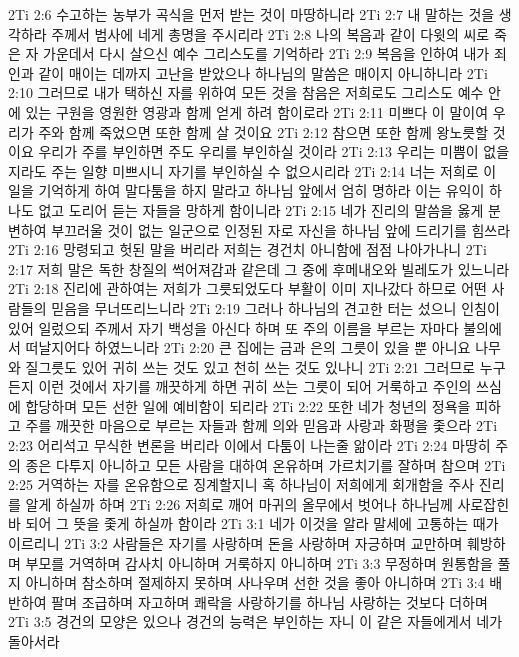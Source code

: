 2Ti 2:6  수고하는 농부가 곡식을 먼저 받는 것이 마땅하니라
2Ti 2:7  내 말하는 것을 생각하라 주께서 범사에 네게 총명을 주시리라
2Ti 2:8  나의 복음과 같이 다윗의 씨로 죽은 자 가운데서 다시 살으신 예수 그리스도를 기억하라
2Ti 2:9  복음을 인하여 내가 죄인과 같이 매이는 데까지 고난을 받았으나 하나님의 말씀은 매이지 아니하니라
2Ti 2:10  그러므로 내가 택하신 자를 위하여 모든 것을 참음은 저희로도 그리스도 예수 안에 있는 구원을 영원한 영광과 함께 얻게 하려 함이로라
2Ti 2:11  미쁘다 이 말이여 우리가 주와 함께 죽었으면 또한 함께 살 것이요
2Ti 2:12  참으면 또한 함께 왕노릇할 것이요 우리가 주를 부인하면 주도 우리를 부인하실 것이라
2Ti 2:13  우리는 미쁨이 없을지라도 주는 일향 미쁘시니 자기를 부인하실 수 없으시리라
2Ti 2:14  너는 저희로 이 일을 기억하게 하여 말다툼을 하지 말라고 하나님 앞에서 엄히 명하라 이는 유익이 하나도 없고 도리어 듣는 자들을 망하게 함이니라
2Ti 2:15  네가 진리의 말씀을 옳게 분변하여 부끄러울 것이 없는 일군으로 인정된 자로 자신을 하나님 앞에 드리기를 힘쓰라
2Ti 2:16  망령되고 헛된 말을 버리라 저희는 경건치 아니함에 점점 나아가나니
2Ti 2:17  저희 말은 독한 창질의 썩어져감과 같은데 그 중에 후메내오와 빌레도가 있느니라
2Ti 2:18  진리에 관하여는 저희가 그릇되었도다 부활이 이미 지나갔다 하므로 어떤 사람들의 믿음을 무너뜨리느니라
2Ti 2:19  그러나 하나님의 견고한 터는 섰으니 인침이 있어 일렀으되 주께서 자기 백성을 아신다 하며 또 주의 이름을 부르는 자마다 불의에서 떠날지어다 하였느니라
2Ti 2:20  큰 집에는 금과 은의 그릇이 있을 뿐 아니요 나무와 질그릇도 있어 귀히 쓰는 것도 있고 천히 쓰는 것도 있나니
2Ti 2:21  그러므로 누구든지 이런 것에서 자기를 깨끗하게 하면 귀히 쓰는 그릇이 되어 거룩하고 주인의 쓰심에 합당하며 모든 선한 일에 예비함이 되리라
2Ti 2:22  또한 네가 청년의 정욕을 피하고 주를 깨끗한 마음으로 부르는 자들과 함께 의와 믿음과 사랑과 화평을 좇으라
2Ti 2:23  어리석고 무식한 변론을 버리라 이에서 다툼이 나는줄 앎이라
2Ti 2:24  마땅히 주의 종은 다투지 아니하고 모든 사람을 대하여 온유하며 가르치기를 잘하며 참으며
2Ti 2:25  거역하는 자를 온유함으로 징계할지니 혹 하나님이 저희에게 회개함을 주사 진리를 알게 하실까 하며
2Ti 2:26  저희로 깨어 마귀의 올무에서 벗어나 하나님께 사로잡힌바 되어 그 뜻을 좇게 하실까 함이라
2Ti 3:1  네가 이것을 알라 말세에 고통하는 때가 이르리니
2Ti 3:2  사람들은 자기를 사랑하며 돈을 사랑하며 자긍하며 교만하며 훼방하며 부모를 거역하며 감사치 아니하며 거룩하지 아니하며
2Ti 3:3  무정하며 원통함을 풀지 아니하며 참소하며 절제하지 못하며 사나우며 선한 것을 좋아 아니하며
2Ti 3:4  배반하여 팔며 조급하며 자고하며 쾌락을 사랑하기를 하나님 사랑하는 것보다 더하며
2Ti 3:5  경건의 모양은 있으나 경건의 능력은 부인하는 자니 이 같은 자들에게서 네가 돌아서라
